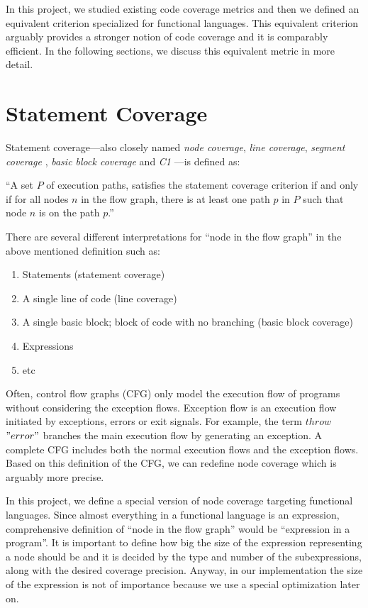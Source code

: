 \documentclass[12pt,a4paper]{report}
\begin{document}
In this project, we studied existing code coverage metrics and then we defined an equivalent criterion specialized for functional languages. This equivalent criterion arguably provides a stronger notion of code coverage and it is comparably efficient. In the following sections, we discuss this equivalent metric in more detail.

\section{Statement Coverage}
Statement coverage---also closely named \emph{node coverage}, \emph{line coverage}, \emph{segment coverage} \cite{Ntafos:1988:CST:630792.631017}, \emph{basic block coverage} and \emph{C1} \cite{beizer2002software}---is defined as: 

``A set $P$ of execution paths, satisfies the statement coverage criterion if and only if for all nodes $n$ in the flow graph, there is at least one path $p$ in $P$ such that node $n$ is on the path $p$.''\cite{Zhu:1997:SUT:267580.267590}

There are several different interpretations for ``node in the flow graph'' in the above mentioned definition such as:

\begin{enumerate}
 \item Statements (statement coverage)
 \item A single line of code (line coverage)
 \item A single basic block; block of code with no branching (basic block coverage)
 \item Expressions 
 \item etc
\end{enumerate}

Often, control flow graphs (CFG) only model the execution flow of programs without considering the exception flows. Exception flow is an execution flow initiated by exceptions, errors or exit signals. For example, the term $throw$ $"error"$  branches the main execution flow by generating an exception. A complete CFG includes both the normal execution flows and the exception flows. Based on this definition of the CFG, we can redefine node coverage which is arguably more precise.

In this project, we define a special version of node coverage targeting functional languages. Since almost everything in a functional language is an expression, comprehensive definition of ``node in the flow graph'' would be ``expression in a program''. It is important to define how big the size of the expression representing a node should be and it is decided by the type and number of the subexpressions, along with the desired coverage precision. Anyway, in our implementation the size of the expression is not of importance because we use a special optimization later on.   
\end{document}
